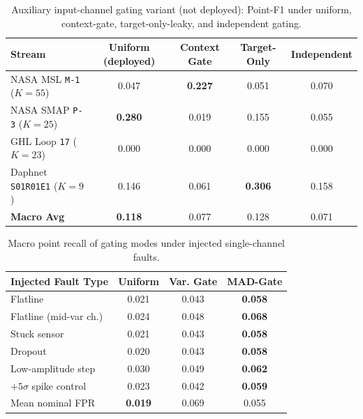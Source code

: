 \begin{table}[h]
\centering
\caption{Auxiliary input-channel gating variant (not deployed): Point-F1 under uniform, context-gate, target-only-leaky, and independent gating.}
\label{tab:gating_variants}
\scriptsize
\setlength{\tabcolsep}{2.5pt}
\begin{tabular}{@{}lcccc@{}}
\toprule
\textbf{Stream} & \textbf{Uniform (deployed)} & \textbf{Context Gate} & \textbf{Target-Only} & \textbf{Independent} \\
\midrule
NASA MSL \texttt{M-1} ($K=55$) & 0.047 & \textbf{0.227} & 0.051 & 0.070 \\
NASA SMAP \texttt{P-3} ($K=25$) & \textbf{0.280} & 0.019 & 0.155 & 0.055 \\
GHL Loop \texttt{17} ($K=23$) & 0.000 & 0.000 & 0.000 & 0.000 \\
Daphnet \texttt{S01R01E1} ($K=9$) & 0.146 & 0.061 & \textbf{0.306} & 0.158 \\
\midrule
\textbf{Macro Avg} & \textbf{0.118} & 0.077 & 0.128 & 0.071 \\
\bottomrule
\end{tabular}
\end{table}

\begin{table}[h]
\centering
\caption{Macro point recall of gating modes under injected single-channel faults.}
\label{tab:fault_recall}
\scriptsize
\setlength{\tabcolsep}{2.5pt}
\begin{tabular}{@{}lccc@{}}
\toprule
\textbf{Injected Fault Type} & \textbf{Uniform} & \textbf{Var. Gate} & \textbf{MAD-Gate} \\
\midrule
Flatline & 0.021 & 0.043 & \textbf{0.058} \\
Flatline (mid-var ch.) & 0.024 & 0.048 & \textbf{0.068} \\
Stuck sensor & 0.021 & 0.043 & \textbf{0.058} \\
Dropout & 0.020 & 0.043 & \textbf{0.058} \\
Low-amplitude step & 0.030 & 0.049 & \textbf{0.062} \\
$+5\sigma$ spike control & 0.023 & 0.042 & \textbf{0.059} \\
\midrule
Mean nominal FPR & \textbf{0.019} & 0.069 & 0.055 \\
\bottomrule
\end{tabular}

\end{table}
